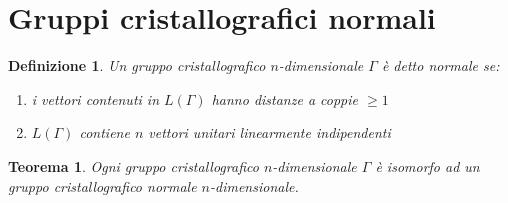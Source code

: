 \documentclass[a4paper,11pt,openright,twoside	]{book}
\newtheorem{definition}{Definizione}[section]
\newtheorem{theorem}{Teorema}[section]
\begin{document}
\section{Gruppi cristallografici normali}
\begin{definition}
Un gruppo cristallografico $n$-dimensionale $\Gamma$ è detto normale se:
\begin{enumerate}
\item i vettori contenuti in $L(\Gamma)$ hanno distanze a coppie $\geq 1$
\item $L(\Gamma)$ contiene $n$ vettori unitari linearmente indipendenti
\end{enumerate}
\end{definition}
\begin{theorem}
\label{teo:grupnorm}
Ogni gruppo cristallografico $n$-dimensionale $\Gamma$ è isomorfo ad un gruppo cristallografico normale $n$-dimensionale.
\end{theorem}
\end{document}
